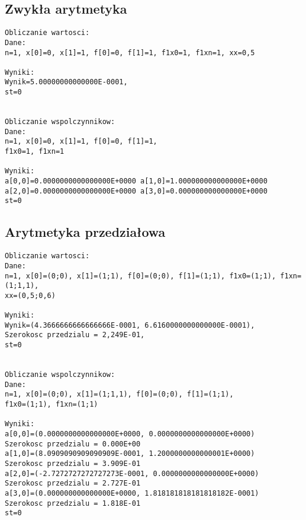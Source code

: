 \documentclass[a4paper, 10pt]{article}
\begin{document}
\subsection*{Zwykła arytmetyka}

\begin{lstlisting}
Obliczanie wartosci:
Dane:
n=1, x[0]=0, x[1]=1, f[0]=0, f[1]=1, f1x0=1, f1xn=1, xx=0,5

Wyniki:
Wynik=5.00000000000000E-0001,
st=0


Obliczanie wspolczynnikow:
Dane:
n=1, x[0]=0, x[1]=1, f[0]=0, f[1]=1,
f1x0=1, f1xn=1

Wyniki: 
a[0,0]=0.0000000000000000E+0000	a[1,0]=1.000000000000000E+0000
a[2,0]=0.0000000000000000E+0000	a[3,0]=0.000000000000000E+0000
st=0
\end{lstlisting}

\subsection*{Arytmetyka przedziałowa}

\begin{lstlisting}
Obliczanie wartosci:
Dane:
n=1, x[0]=(0;0), x[1]=(1;1), f[0]=(0;0), f[1]=(1;1), f1x0=(1;1), f1xn=(1;1,1),
xx=(0,5;0,6)

Wyniki:
Wynik=(4.3666666666666666E-0001, 6.6160000000000000E-0001),
Szerokosc przedzialu = 2,249E-01,
st=0


Obliczanie wspolczynnikow:
Dane:
n=1, x[0]=(0;0), x[1]=(1;1,1), f[0]=(0;0), f[1]=(1;1),
f1x0=(1;1), f1xn=(1;1)

Wyniki: 
a[0,0]=(0.0000000000000000E+0000, 0.0000000000000000E+0000)
Szerokosc przedzialu = 0.000E+00
a[1,0]=(8.0909090909090909E-0001, 1.2000000000000001E+0000)
Szerokosc przedzialu = 3.909E-01
a[2,0]=(-2.7272727272727273E-0001, 0.0000000000000000E+0000)
Szerokosc przedzialu = 2.727E-01
a[3,0]=(0.000000000000000E+0000, 1.818181818181818182E-0001)
Szerokosc przedzialu = 1.818E-01
st=0

\end{lstlisting}
\end{document}
